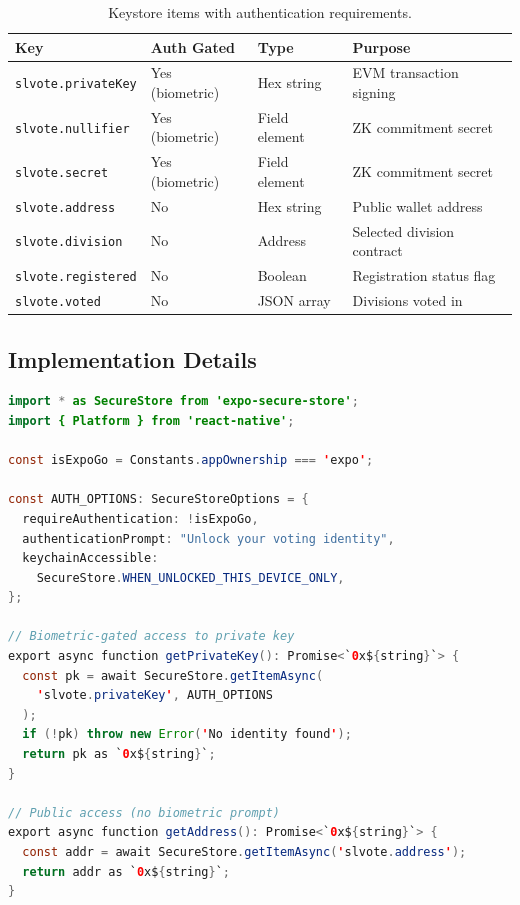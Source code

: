 \begin{table}[H]
\centering
\caption{Keystore items with authentication requirements.}
\label{tab:keystore-items}
\begin{tabular}{|l|l|l|p{4cm}|}
\hline
\textbf{Key} & \textbf{Auth Gated} & \textbf{Type} & \textbf{Purpose} \\
\hline
\texttt{slvote.privateKey} & Yes (biometric) & Hex string & EVM transaction signing \\
\hline
\texttt{slvote.nullifier} & Yes (biometric) & Field element & ZK commitment secret \\
\hline
\texttt{slvote.secret} & Yes (biometric) & Field element & ZK commitment secret \\
\hline
\texttt{slvote.address} & No & Hex string & Public wallet address \\
\hline
\texttt{slvote.division} & No & Address & Selected division contract \\
\hline
\texttt{slvote.registered} & No & Boolean & Registration status flag \\
\hline
\texttt{slvote.voted} & No & JSON array & Divisions voted in \\
\hline
\end{tabular}
\end{table}

\subsection{Implementation Details}

\begin{lstlisting}[language=Java, caption={Keystore implementation with biometric gating.}]
import * as SecureStore from 'expo-secure-store';
import { Platform } from 'react-native';

const isExpoGo = Constants.appOwnership === 'expo';

const AUTH_OPTIONS: SecureStoreOptions = {
  requireAuthentication: !isExpoGo,
  authenticationPrompt: "Unlock your voting identity",
  keychainAccessible: 
    SecureStore.WHEN_UNLOCKED_THIS_DEVICE_ONLY,
};

// Biometric-gated access to private key
export async function getPrivateKey(): Promise<`0x${string}`> {
  const pk = await SecureStore.getItemAsync(
    'slvote.privateKey', AUTH_OPTIONS
  );
  if (!pk) throw new Error('No identity found');
  return pk as `0x${string}`;
}

// Public access (no biometric prompt)
export async function getAddress(): Promise<`0x${string}`> {
  const addr = await SecureStore.getItemAsync('slvote.address');
  return addr as `0x${string}`;
}
\end{lstlisting}

